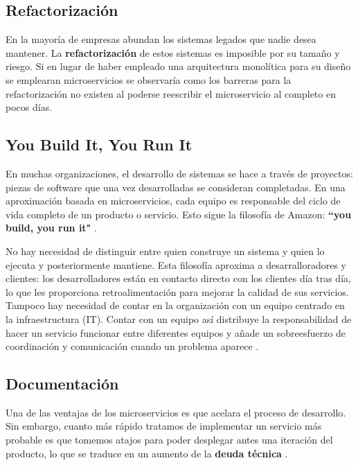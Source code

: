 \documentclass[11pt,spanish,listoffigures]{tfgetsinf}
\begin{document}
\subsection{Refactorización}


En la mayoría de empresas abundan los sistemas legados que nadie desea mantener. La \textbf{refactorización} de estos sistemas es imposible por su tamaño y riesgo. Si en lugar de haber empleado una arquitectura monolítica para su diseño se emplearan microservicios se observaría como los barreras para la refactorización no existen al poderse reescribir el microservicio al completo en pocos días. \cite{Eaves2014}

\subsection{You Build It, You Run It}

En muchas organizaciones, el desarrollo de sistemas se hace a través de proyectos: piezas de software que una vez desarrolladas se consideran completadas. En una aproximación basada en microservicios, cada equipo es responsable del ciclo de vida completo de un producto o servicio. Esto sigue la filosofía de Amazon: \textbf{``you build, you run it"} \cite{Lewis2014}.

No hay necesidad de distinguir entre quien construye un sistema y quien lo ejecuta y posteriormente mantiene. Esta filosofía aproxima a desarralloradores y clientes: los desarrolladores están en contacto directo con los clientes día tras día, lo que les proporciona retroalimentación para mejorar la calidad de sus servicios. Tampoco hay necesidad de contar en la organización con un equipo centrado en la infraestructura (IT). Contar con un equipo así distribuye la responsabilidad de hacer un servicio funcionar entre diferentes equipos y añade un sobreesfuerzo de coordinación y comunicación cuando un problema aparece \cite{Vliet2011}.

\subsection{Documentación}

Una de las ventajas de los microservicios es que acelara el proceso de desarrollo. Sin embargo, cuanto más rápido tratamos de implementar un servicio más probable es que tomemos atajos para poder desplegar antes una iteración del producto, lo que se traduce en un aumento de la \textbf{deuda técnica} \cite{FowlerSusan}.
\end{document}
